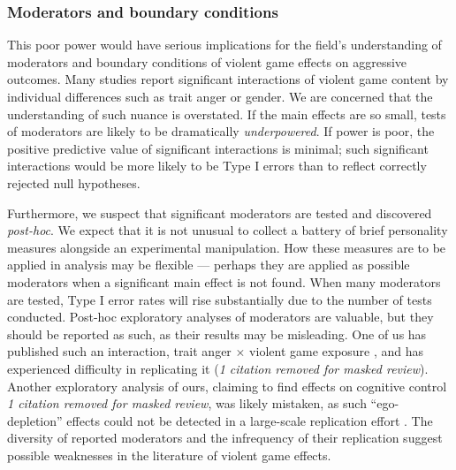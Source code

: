 \documentclass[man, mask]{apa6}
\begin{document}
\subsubsection{Moderators and boundary conditions}
This poor power would have serious implications for the field's understanding of moderators and boundary conditions of violent game effects on aggressive outcomes. Many studies report significant interactions of violent game content by individual differences such as trait anger or gender. We are concerned that the understanding of such nuance is overstated. If the main effects are so small, tests of moderators are likely to be dramatically {\em underpowered}. If power is poor, the positive predictive value of significant interactions is minimal; such significant interactions would be more likely to be Type I errors than to reflect correctly rejected null hypotheses. 

Furthermore, we suspect that significant moderators are tested and discovered {\em post-hoc}. We expect that it is not unusual to collect a battery of brief personality measures alongside an experimental manipulation. How these measures are to be applied in analysis may be flexible --- perhaps they are applied as possible moderators when a significant main effect is not found. When many moderators are tested, Type I error rates will rise substantially due to the number of tests conducted. Post-hoc exploratory analyses of moderators are valuable, but they should be reported as such, as their results may be misleading. %
One of us has published such an interaction, trait anger $\times$ violent game exposure , and has experienced difficulty in replicating it ({\em 1 citation removed for masked review}). Another exploratory analysis of ours, claiming to find effects on cognitive control {\em 1 citation removed for masked review}, was likely mistaken, as such ``ego-depletion'' effects could not be detected in a large-scale replication effort \citep{Hagger:etal:inpress}. The diversity of reported moderators and the infrequency of their replication suggest possible weaknesses in the literature of violent game effects. 
\end{document}
